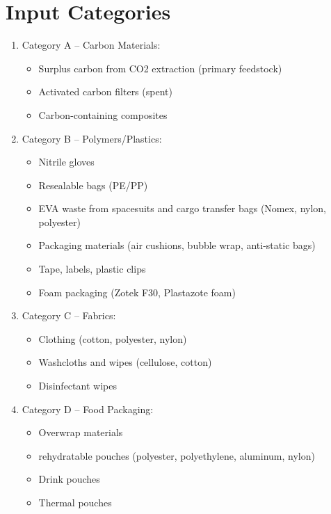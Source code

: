 \documentclass[12pt, a4paper]{article}
\begin{document}
\section{Input Categories}
\begin{enumerate}
    \item{Category A -- Carbon Materials:}
    \begin{itemize}
        \item Surplus carbon from CO2 extraction (primary feedstock)
        \item Activated carbon filters (spent)
        \item Carbon-containing composites
    \end{itemize}

    \item{Category B -- Polymers/Plastics: }
    \begin{itemize}
        \item Nitrile gloves
        \item Resealable bags (PE/PP)
        \item EVA waste from spacesuits and cargo transfer bags (Nomex, nylon, polyester)
        \item Packaging materials (air cushions, bubble wrap, anti-static bags)
        \item Tape, labels, plastic clips
        \item Foam packaging (Zotek F30, Plastazote foam)
    \end{itemize}

    \item{Category C -- Fabrics: }
    \begin{itemize}
        \item Clothing (cotton, polyester, nylon)
        \item Washcloths and wipes (cellulose, cotton)
        \item Disinfectant wipes 
    \end{itemize}

    \item{Category D -- Food Packaging: }
    \begin{itemize}
        \item Overwrap materials
        \item rehydratable pouches (polyester, polyethylene, aluminum, nylon)
        \item Drink pouches
        \item Thermal pouches
    \end{itemize}


\end{enumerate}
\end{document}
